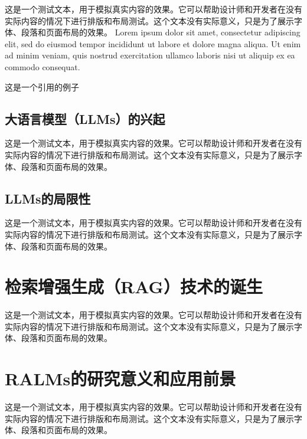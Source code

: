 这是一个测试文本，用于模拟真实内容的效果。它可以帮助设计师和开发者在没有实际内容的情况下进行排版和布局测试。这个文本没有实际意义，只是为了展示字体、段落和页面布局的效果。
Lorem ipsum dolor sit amet, consectetur adipiscing elit, sed do eiusmod tempor incididunt ut labore et dolore magna aliqua. Ut enim ad minim veniam, quis nostrud exercitation ullamco laboris nisi ut aliquip ex ea commodo consequat.

这是一个引用的例子~\cite{
    Yao2024, 
    Fan2024, 
    Yang2024,
    Posedaru2024, 
    Wiratunga2024, 
    ke2024developmenttestingretrievalaugmented, 
    li2024enhancingllmfactualaccuracy, 
    Daneshvar2024, 
    He2024,
    siriwardhana2022improvingdomainadaptationretrieval, 
    Miao2024, 
    Zhang2024, 
    li2024laragenhancingllmbasedasraccuracy, 
    Wu2024,
    wang2024llmsknowneedleveraging, 
    Kuppa2024,
    https://doi.org/10.1111/liv.15974, 
    hu2024promptperturbationretrievalaugmentedgeneration, 
    hu2024ragrausurveyretrievalaugmented,
    destefano2024ragrollendtoendevaluation,
    Phan2024,
    Zhao2024,
    li2024retrievalaugmentedgenerationlongcontext,
    Lewis2020,
    Xu2024,
    Ahn2022,
    Zhang2023,
    Glass1949,
    Chan2024,
    Laban2024,
    Fatehkia2024,
    Yilma2024,
    Zeng2024,
    Cuconasu2024,
    Cheng2024,
    Nam2024,
    Kreimeyer2024,
    du2024vulragenhancingllmbasedvulnerability,
    WOS:000452649406008,
    guu2020realmretrievalaugmentedlanguagemodel,
    WOS:000900116904035
    }

\subsection{大语言模型（LLMs）的兴起}
这是一个测试文本，用于模拟真实内容的效果。它可以帮助设计师和开发者在没有实际内容的情况下进行排版和布局测试。这个文本没有实际意义，只是为了展示字体、段落和页面布局的效果。

\subsection{LLMs的局限性}
这是一个测试文本，用于模拟真实内容的效果。它可以帮助设计师和开发者在没有实际内容的情况下进行排版和布局测试。这个文本没有实际意义，只是为了展示字体、段落和页面布局的效果。

\section{检索增强生成（RAG）技术的诞生}
这是一个测试文本，用于模拟真实内容的效果。它可以帮助设计师和开发者在没有实际内容的情况下进行排版和布局测试。这个文本没有实际意义，只是为了展示字体、段落和页面布局的效果。

\section{RALMs的研究意义和应用前景}
这是一个测试文本，用于模拟真实内容的效果。它可以帮助设计师和开发者在没有实际内容的情况下进行排版和布局测试。这个文本没有实际意义，只是为了展示字体、段落和页面布局的效果。
